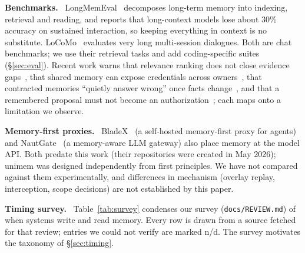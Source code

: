 \documentclass[10pt,twocolumn]{article}
\newcommand{\sys}{\textsf{unimem}}
\newcommand{\code}[1]{\texttt{\small #1}}
\newcommand{\para}[1]{\smallskip\noindent\textbf{#1}\ }
\begin{document}
\para{Benchmarks.} LongMemEval~\cite{longmemeval} decomposes long-term memory into indexing, retrieval and reading,
and reports that long-context models lose about 30\% accuracy on sustained interaction, so keeping everything in
context is no substitute. LoCoMo~\cite{locomo} evaluates very long multi-session dialogues. Both are chat benchmarks;
we use their retrieval tasks and add coding-specific suites (\S\ref{sec:eval}). Recent work warns that relevance
ranking does not close evidence gaps~\cite{relevancesufficiency}, that shared memory can expose credentials across
owners~\cite{whosecredential}, that contracted memories ``quietly answer wrong'' once facts change~\cite{manysteps},
and that a remembered proposal must not become an authorization~\cite{groundingawareness}; each maps onto a
limitation we observe.

\para{Memory-first proxies.} BladeX~\cite{bladex} (a self-hosted memory-first proxy for agents) and
NautGate~\cite{nautgate} (a memory-aware LLM gateway) also place memory at the model API. Both predate this work
(their repositories were created in May 2026); \sys{} was designed independently from first principles. We have not compared against them
experimentally, and differences in mechanism (overlay replay, interception, scope decisions) are not established
by this paper.

\para{Timing survey.} Table~\ref{tab:survey} condenses our survey (\code{docs/REVIEW.md}) of when systems write and
read memory. Every row is drawn from a source fetched for that review; entries we could not verify are marked n/d.
The survey motivates the taxonomy of \S\ref{sec:timing}.
\end{document}
